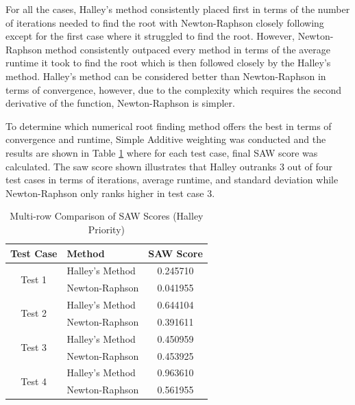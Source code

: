 \documentclass[a4paper,11pt]{article}
\begin{document}
For all the cases, Halley's method consistently placed first in terms of the number of iterations needed to find the root with Newton-Raphson closely following except for the first case where it struggled to find the root. However, Newton-Raphson method consistently outpaced every method in terms of the average runtime it took to find the root which is then followed closely by the Halley's method. Halley's method can be considered better than Newton-Raphson in terms of convergence, however, due to the complexity which requires the second derivative of the function, Newton-Raphson is simpler. 

To determine which numerical root finding method offers the best in terms of convergence and runtime, Simple Additive weighting was conducted and the results are shown in Table \ref{tab:saw-result-1} where for each test case, final SAW score was calculated. The saw score shown illustrates that Halley outranks 3 out of four test cases in terms of iterations, average runtime, and standard deviation while Newton-Raphson only ranks higher in test case 3.

\begin{table}[H]
    \centering
    \caption{Multi-row Comparison of SAW Scores (Halley Priority)}
    \label{tab:saw-result-1}
    \vspace{2mm}
    \begin{tabular}{clc}
        \toprule
        \textbf{Test Case} & \textbf{Method} & \textbf{SAW Score} \\
        \midrule
        \multirow{2}{*}{Test 1} & Halley's Method & 0.245710 \\
                                & Newton-Raphson & 0.041955 \\
        \midrule
        \multirow{2}{*}{Test 2} & Halley's Method & 0.644104 \\
                                & Newton-Raphson & 0.391611 \\
        \midrule
        \multirow{2}{*}{Test 3} & Halley's Method & 0.450959 \\
                                & Newton-Raphson & 0.453925 \\
        \midrule
        \multirow{2}{*}{Test 4} & Halley's Method & 0.963610 \\
                                & Newton-Raphson & 0.561955 \\
        \bottomrule
    \end{tabular}
\end{table}
\end{document}
